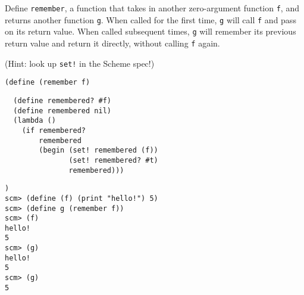 \question
Define \texttt{remember}, a function that takes in another zero-argument function \texttt{f}, and returns another function \texttt{g}. When called for the first time, \texttt{g} will call \texttt{f} and pass on its return value. When called subsequent times, \texttt{g} will remember its previous return value and return it directly, without calling \texttt{f} again.

(Hint: look up \texttt{set!} in the Scheme spec!)

\begin{lstlisting}
(define (remember f)
\end{lstlisting}

\begin{solution}[0.75in]
\begin{lstlisting}
  (define remembered? #f)
  (define remembered nil)
  (lambda ()
    (if remembered?
        remembered
        (begin (set! remembered (f))
               (set! remembered? #t)
               remembered)))
\end{lstlisting}
\end{solution}

\begin{lstlisting}
)
scm> (define (f) (print "hello!") 5)
scm> (define g (remember f))
scm> (f)
hello!
5
scm> (g)
hello!
5
scm> (g)
5
\end{lstlisting}
